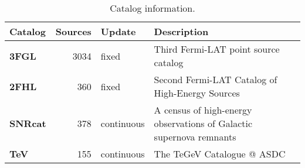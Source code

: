 \begin{table}[h]

\caption{Catalog information.}
\label{tab:a}
\begin{tabular}{ || lrll ||}
\hline


\textbf{Catalog} & \textbf{Sources} & \textbf{Update} & \textbf{Description} \\ \hline
\textbf{3FGL} & 3034 & fixed & Third Fermi-LAT point source catalog\\
\textbf{2FHL} & 360 & fixed & Second Fermi-LAT Catalog of High-Energy Sources\\
\textbf{SNRcat} & 378 & continuous & A census of high-energy observations of Galactic supernova remnants\\
\textbf{TeV} & 155 & continuous & The TeGeV Catalogue @ ASDC\\
\hline
\end{tabular}
\end{table}
